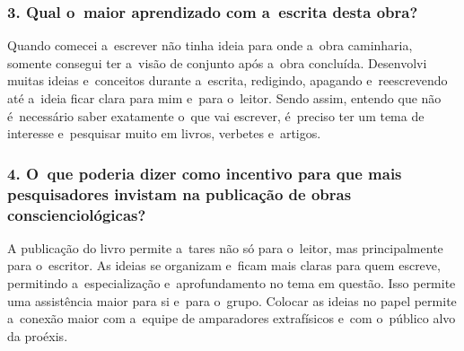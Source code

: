 \documentclass{gescons}
\begin{document}
\begin{multicols}{2}
\subsubsection{3. Qual o~maior aprendizado com a~escrita desta obra?}


Quando comecei a~escrever não tinha ideia para onde a~obra caminharia, somente consegui ter a~visão de conjunto após a~obra concluída. Desenvolvi muitas ideias e~conceitos durante a~escrita, redigindo, apagando e~reescrevendo até a~ideia ficar clara para mim e~para o~leitor. Sendo assim, entendo que não é~necessário saber exatamente o~que vai escrever, é~preciso ter um tema de interesse e~pesquisar muito em livros, verbetes e~artigos.


\subsubsection{4. O~que poderia dizer como incentivo para que mais pesquisadores invistam na publicação de obras conscienciológicas?}

A publicação do livro permite a~tares não só para o~leitor, mas principalmente para o~escritor. As ideias se organizam e~ficam mais claras para quem escreve, permitindo a~especialização e~aprofundamento no tema em questão. Isso permite uma assistência maior para si e~para o~grupo. Colocar as ideias no papel permite a~conexão maior com a~equipe de amparadores extrafísicos e~com o~público alvo da proéxis.
    
    \end{multicols}
\end{document}
